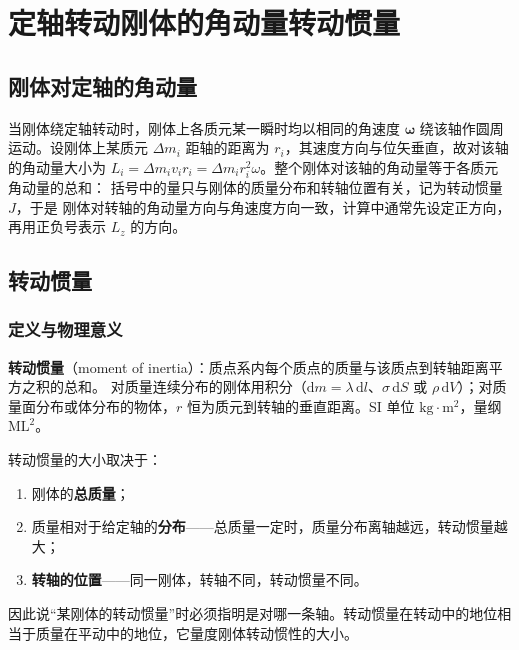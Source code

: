 \section{定轴转动刚体的角动量\texorpdfstring{\hspace{0.5em}}{ }转动惯量}
    \subsection{刚体对定轴的角动量}
    当刚体绕定轴转动时，刚体上各质元某一瞬时均以相同的角速度 $\boldsymbol{\omega}$ 绕该轴作圆周运动。设刚体上某质元 $\Delta m_{i}$ 距轴的距离为 $r_{i}$，其速度方向与位矢垂直，故对该轴的角动量大小为 $L_{i}=\Delta m_{i}v_{i}r_{i}=\Delta m_{i}r_{i}^{2}\omega$。整个刚体对该轴的角动量等于各质元角动量的总和：
    括号中的量只与刚体的质量分布和转轴位置有关，记为转动惯量 $J$，于是
    刚体对转轴的角动量方向与角速度方向一致，计算中通常先设定正方向，再用正负号表示 $L_{z}$ 的方向。

    \subsection{转动惯量}
        \subsubsection{定义与物理意义}
        \textbf{转动惯量}（moment of inertia）：质点系内每个质点的质量与该质点到转轴距离平方之积的总和。
        对质量连续分布的刚体用积分（$\mathrm{d}m=\lambda\,\mathrm{d}l$、$\sigma\,\mathrm{d}S$ 或 $\rho\,\mathrm{d}V$）；对质量面分布或体分布的物体，$r$ 恒为质元到转轴的垂直距离。SI 单位 $\mathrm{kg\cdot m^{2}}$，量纲 $\mathrm{ML^{2}}$。

        转动惯量的大小取决于：
        \begin{enumerate}
            \item 刚体的\textbf{总质量}；
            \item 质量相对于给定轴的\textbf{分布}——总质量一定时，质量分布离轴越远，转动惯量越大；
            \item \textbf{转轴的位置}——同一刚体，转轴不同，转动惯量不同。
        \end{enumerate}
        因此说“某刚体的转动惯量”时必须指明是对哪一条轴。转动惯量在转动中的地位相当于质量在平动中的地位，它量度刚体转动惯性的大小。

